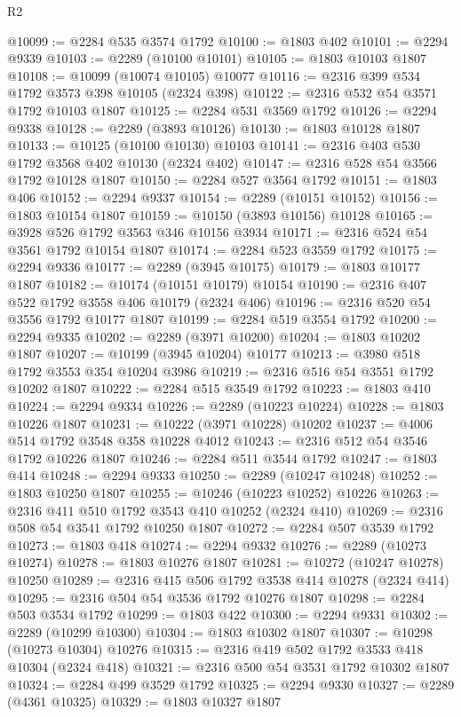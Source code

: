 \begin{lexlean}{R2}
\begin{coremodule}
@10099 := @2284 @535 @3574 @1792
@10100 := @1803 @402
@10101 := @2294 @9339
@10103 := @2289 (@10100 @10101)
@10105 := @1803 @10103 @1807
@10108 := @10099 (@10074 @10105) @10077
@10116 := @2316 @399 @534 @1792 @3573 @398 @10105 (@2324 @398)
@10122 := @2316 @532 @54 @3571 @1792 @10103 @1807
@10125 := @2284 @531 @3569 @1792
@10126 := @2294 @9338
@10128 := @2289 (@3893 @10126)
@10130 := @1803 @10128 @1807
@10133 := @10125 (@10100 @10130) @10103
@10141 := @2316 @403 @530 @1792 @3568 @402 @10130 (@2324 @402)
@10147 := @2316 @528 @54 @3566 @1792 @10128 @1807
@10150 := @2284 @527 @3564 @1792
@10151 := @1803 @406
@10152 := @2294 @9337
@10154 := @2289 (@10151 @10152)
@10156 := @1803 @10154 @1807
@10159 := @10150 (@3893 @10156) @10128
@10165 := @3928 @526 @1792 @3563 @346 @10156 @3934
@10171 := @2316 @524 @54 @3561 @1792 @10154 @1807
@10174 := @2284 @523 @3559 @1792
@10175 := @2294 @9336
@10177 := @2289 (@3945 @10175)
@10179 := @1803 @10177 @1807
@10182 := @10174 (@10151 @10179) @10154
@10190 := @2316 @407 @522 @1792 @3558 @406 @10179 (@2324 @406)
@10196 := @2316 @520 @54 @3556 @1792 @10177 @1807
@10199 := @2284 @519 @3554 @1792
@10200 := @2294 @9335
@10202 := @2289 (@3971 @10200)
@10204 := @1803 @10202 @1807
@10207 := @10199 (@3945 @10204) @10177
@10213 := @3980 @518 @1792 @3553 @354 @10204 @3986
@10219 := @2316 @516 @54 @3551 @1792 @10202 @1807
@10222 := @2284 @515 @3549 @1792
@10223 := @1803 @410
@10224 := @2294 @9334
@10226 := @2289 (@10223 @10224)
@10228 := @1803 @10226 @1807
@10231 := @10222 (@3971 @10228) @10202
@10237 := @4006 @514 @1792 @3548 @358 @10228 @4012
@10243 := @2316 @512 @54 @3546 @1792 @10226 @1807
@10246 := @2284 @511 @3544 @1792
@10247 := @1803 @414
@10248 := @2294 @9333
@10250 := @2289 (@10247 @10248)
@10252 := @1803 @10250 @1807
@10255 := @10246 (@10223 @10252) @10226
@10263 := @2316 @411 @510 @1792 @3543 @410 @10252 (@2324 @410)
@10269 := @2316 @508 @54 @3541 @1792 @10250 @1807
@10272 := @2284 @507 @3539 @1792
@10273 := @1803 @418
@10274 := @2294 @9332
@10276 := @2289 (@10273 @10274)
@10278 := @1803 @10276 @1807
@10281 := @10272 (@10247 @10278) @10250
@10289 := @2316 @415 @506 @1792 @3538 @414 @10278 (@2324 @414)
@10295 := @2316 @504 @54 @3536 @1792 @10276 @1807
@10298 := @2284 @503 @3534 @1792
@10299 := @1803 @422
@10300 := @2294 @9331
@10302 := @2289 (@10299 @10300)
@10304 := @1803 @10302 @1807
@10307 := @10298 (@10273 @10304) @10276
@10315 := @2316 @419 @502 @1792 @3533 @418 @10304 (@2324 @418)
@10321 := @2316 @500 @54 @3531 @1792 @10302 @1807
@10324 := @2284 @499 @3529 @1792
@10325 := @2294 @9330
@10327 := @2289 (@4361 @10325)
@10329 := @1803 @10327 @1807

\end{coremodule}
\end{lexlean}
